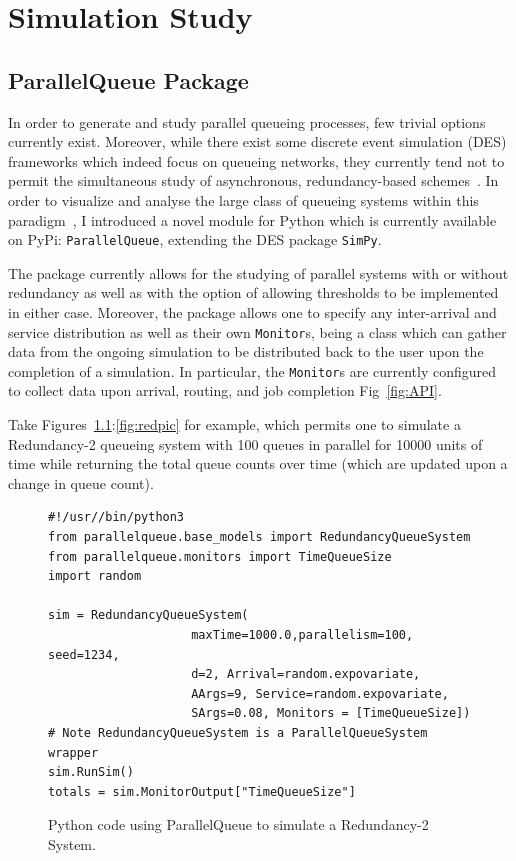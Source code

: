 \chapter{Simulation Study}\label{ch:simulation-study}


\section{ParallelQueue Package}\label{sec:parallelqueue-package}
In order to generate and study parallel queueing processes, few trivial options currently exist.
Moreover, while there exist some discrete event simulation (DES) frameworks which indeed focus on queueing networks, they currently tend not to permit the simultaneous study of asynchronous, redundancy-based schemes~\cite{noauthor_ciwpythonciw_nodate}.
In order to visualize and analyse the large class of queueing systems within this paradigm~\cite{shneer_large-scale_2020,cruise_stability_2020}, I introduced a novel module for Python which is currently available on PyPi: \lstinline{ParallelQueue}, extending the DES package \lstinline{SimPy}.

The package currently allows for the studying of parallel systems with or without redundancy as well as with the option of allowing thresholds to be implemented in either case.
Moreover, the package allows one to specify any inter-arrival and service distribution as well as their own \lstinline{Monitor}s, being a class which can gather data from the ongoing simulation to be distributed back to the user upon the completion of a simulation.
In particular, the \lstinline{Monitor}s are currently configured to collect data upon arrival, routing, and job completion Fig~\ref{fig:API}.

Take Figures~\ref{fig:red}:\ref{fig:redpic} for example, which permits one to simulate a Redundancy-2 queueing system with 100 queues in parallel for 10000 units of time while returning the total queue counts over time (which are updated upon a change in queue count).

\begin{figure}

    \begin{lstlisting}[label={lst:lstlisting}]
#!/usr//bin/python3
from parallelqueue.base_models import RedundancyQueueSystem
from parallelqueue.monitors import TimeQueueSize
import random

sim = RedundancyQueueSystem(
                    maxTime=1000.0,parallelism=100, seed=1234,
                    d=2, Arrival=random.expovariate,
                    AArgs=9, Service=random.expovariate,
                    SArgs=0.08, Monitors = [TimeQueueSize])
# Note RedundancyQueueSystem is a ParallelQueueSystem wrapper
sim.RunSim()
totals = sim.MonitorOutput["TimeQueueSize"]
    \end{lstlisting}
    \caption{Python code using ParallelQueue to simulate a Redundancy-2 System.}
    \label{fig:red}
\end{figure}

